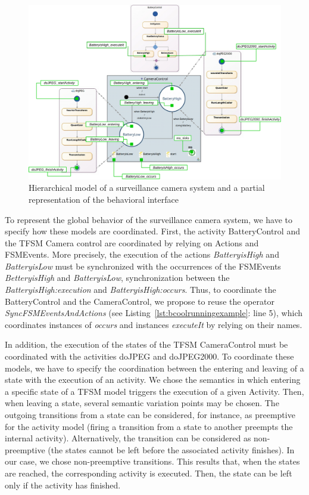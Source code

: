 \begin{figure}
	\center
	\includegraphics[width=1\columnwidth]{examples/figs/picmodels.pdf}
	\caption{Hierarchical model of a surveillance camera system and a partial representation of the behavioral interface}
	\label{fig:camerasystem}
\end{figure}

To represent the global behavior of the surveillance camera system, we have to specify how these models are coordinated. First, the activity BatteryControl and the TFSM Camera control are coordinated by relying on Actions and FSMEvents. More precisely, the execution of the actions \emph{BatteryisHigh} and \emph{BatteryisLow} must be synchronized with the occurrences of the FSMEvents \emph{BetteryisHigh} and \emph{BatteryisLow}, \eg synchronization between the \mse \emph{BatteryisHigh:execution} and \emph{BatteryisHigh:occurs}. Thus, to coordinate the BatteryControl and the CameraControl, we propose to reuse the operator \emph{SyncFSMEventsAndActions} (see Listing~\ref{lst:bcoolrunningexample}: line 5), which coordinates instances of \dse \emph{occurs} and instances \dse \emph{executeIt} by relying on their names. 

In addition, the execution of the states of the TFSM CameraControl must be coordinated with the activities doJPEG and doJPEG2000. To coordinate these models, we have to specify the coordination between the entering and leaving of a state with the execution of an activity. We chose the semantics in which entering a specific state of a TFSM model triggers the execution of a given Activity. Then, when leaving a state, several semantic variation points may be chosen. The outgoing transitions from a state can be considered, for instance, as preemptive for the activity model (\ie firing a transition from a state to another preempts the internal activity). Alternatively, the transition can be considered as non-preemptive (\ie the states cannot be left before the associated activity finishes). In our case, we chose non-preemptive transitions. This results that, when the states are reached, the corresponding activity is executed. Then, the state can be left only if the activity has finished. 

